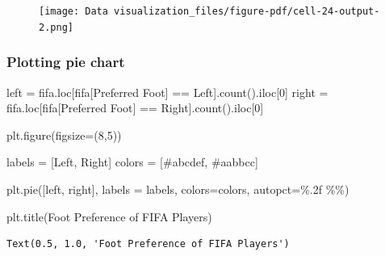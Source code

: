 \documentclass[
  letterpaper,
  DIV=11,
  numbers=noendperiod]{scrreprt}
\newenvironment{Shaded}{\begin{snugshade}}{\end{snugshade}}
\newcommand{\DecValTok}[1]{\textcolor[rgb]{0.68,0.00,0.00}{#1}}
\newcommand{\NormalTok}[1]{\textcolor[rgb]{0.00,0.23,0.31}{#1}}
\newcommand{\OperatorTok}[1]{\textcolor[rgb]{0.37,0.37,0.37}{#1}}
\newcommand{\SpecialCharTok}[1]{\textcolor[rgb]{0.37,0.37,0.37}{#1}}
\newcommand{\StringTok}[1]{\textcolor[rgb]{0.13,0.47,0.30}{#1}}
\begin{document}
\begin{figure}[H]

{\centering \texttt{[image: Data visualization\_files/figure-pdf/cell-24-output-2.png]}

}

\end{figure}

\hypertarget{plotting-pie-chart}{%
\subsubsection{Plotting pie chart}\label{plotting-pie-chart}}

\begin{Shaded}
\begin{Highlighting}[]
\NormalTok{left }\OperatorTok{=}\NormalTok{ fifa.loc[fifa[}\StringTok{\textquotesingle{}Preferred Foot\textquotesingle{}}\NormalTok{] }\OperatorTok{==} \StringTok{\textquotesingle{}Left\textquotesingle{}}\NormalTok{].count().iloc[}\DecValTok{0}\NormalTok{]}
\NormalTok{right }\OperatorTok{=}\NormalTok{ fifa.loc[fifa[}\StringTok{\textquotesingle{}Preferred Foot\textquotesingle{}}\NormalTok{] }\OperatorTok{==} \StringTok{\textquotesingle{}Right\textquotesingle{}}\NormalTok{].count().iloc[}\DecValTok{0}\NormalTok{]}

\NormalTok{plt.figure(figsize}\OperatorTok{=}\NormalTok{(}\DecValTok{8}\NormalTok{,}\DecValTok{5}\NormalTok{))}

\NormalTok{labels }\OperatorTok{=}\NormalTok{ [}\StringTok{\textquotesingle{}Left\textquotesingle{}}\NormalTok{, }\StringTok{\textquotesingle{}Right\textquotesingle{}}\NormalTok{]}
\NormalTok{colors }\OperatorTok{=}\NormalTok{ [}\StringTok{\textquotesingle{}\#abcdef\textquotesingle{}}\NormalTok{, }\StringTok{\textquotesingle{}\#aabbcc\textquotesingle{}}\NormalTok{]}

\NormalTok{plt.pie([left, right], labels }\OperatorTok{=}\NormalTok{ labels, colors}\OperatorTok{=}\NormalTok{colors, autopct}\OperatorTok{=}\StringTok{\textquotesingle{}}\SpecialCharTok{\%.2f}\StringTok{ }\SpecialCharTok{\%\%}\StringTok{\textquotesingle{}}\NormalTok{)}

\NormalTok{plt.title(}\StringTok{\textquotesingle{}Foot Preference of FIFA Players\textquotesingle{}}\NormalTok{)}
\end{Highlighting}
\end{Shaded}

\begin{verbatim}
Text(0.5, 1.0, 'Foot Preference of FIFA Players')
\end{verbatim}
\end{document}
